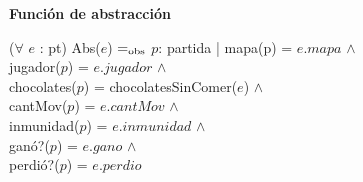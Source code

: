\documentclass[10pt, a4paper]{article}
\begin{document}
    \newpage

    \textbf{Función de abstracción}


        ($\forall$ $e$ : pt) Abs($e$) $=_{\mathrm{obs}}$ $p$: partida | mapa(p) = $e.mapa$ $\wedge$ \\
            \text{}\quad\qquad jugador($p$) = $e.jugador$ $\wedge$ \\
            \text{}\quad\qquad chocolates($p$) = chocolatesSinComer($e$) $\wedge$ \\
            \text{}\quad\qquad cantMov($p$) = $e.cantMov$ $\wedge$ \\
            \text{}\quad\qquad inmunidad($p$) = $e.inmunidad$ $\wedge$ \\
            \text{}\quad\qquad ganó?($p$) = $e.gano$ $\wedge$ \\
            \text{}\quad\qquad perdió?($p$) = $e.perdio$
\end{document}

